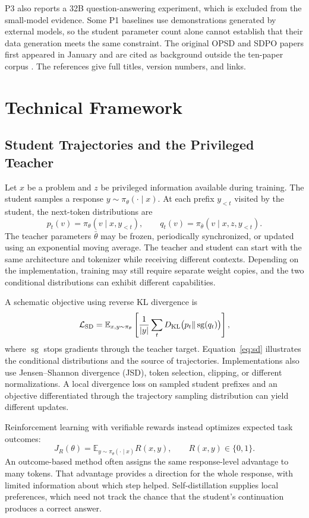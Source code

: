 \documentclass[11pt,a4paper]{article}
\begin{document}
P3 also reports a 32B question-answering experiment, which is excluded from the small-model evidence. Some P1 baselines use demonstrations generated by external models, so the student parameter count alone cannot establish that their data generation meets the same constraint. The original OPSD and SDPO papers first appeared in January and are cited as background outside the ten-paper corpus \cite{opsd,sdpo}. The references give full titles, version numbers, and links.

\section{Technical Framework}
\subsection{Student Trajectories and the Privileged Teacher}
Let \(x\) be a problem and \(z\) be privileged information available during training. The student samples a response \(y\sim\pi_\theta(\cdot\mid x)\). At each prefix \(y_{<t}\) visited by the student, the next-token distributions are
\begin{equation}
p_t(v)=\pi_\theta(v\mid x,y_{<t}),\qquad
q_t(v)=\pi_{\bar\theta}(v\mid x,z,y_{<t}).
\end{equation}
The teacher parameters \(\bar\theta\) may be frozen, periodically synchronized, or updated using an exponential moving average. The teacher and student can start with the same architecture and tokenizer while receiving different contexts. Depending on the implementation, training may still require separate weight copies, and the two conditional distributions can exhibit different capabilities.

A schematic objective using reverse KL divergence is
\begin{equation}
\mathcal L_{\rm SD}=\mathbb E_{x,y\sim\pi_\theta}
\left[\frac{1}{|y|}\sum_t
D_{\rm KL}\bigl(p_t\|\operatorname{sg}(q_t)\bigr)\right],
\label{eq:sd}
\end{equation}
where \(\operatorname{sg}\) stops gradients through the teacher target. Equation~\eqref{eq:sd} illustrates the conditional distributions and the source of trajectories. Implementations also use Jensen--Shannon divergence (JSD), token selection, clipping, or different normalizations. A local divergence loss on sampled student prefixes and an objective differentiated through the trajectory sampling distribution can yield different updates.

Reinforcement learning with verifiable rewards instead optimizes expected task outcomes:
\begin{equation}
J_R(\theta)=\mathbb E_{y\sim\pi_\theta(\cdot\mid x)}R(x,y),\qquad
R(x,y)\in\{0,1\}.
\end{equation}
An outcome-based method often assigns the same response-level advantage to many tokens. That advantage provides a direction for the whole response, with limited information about which step helped. Self-distillation supplies local preferences, which need not track the chance that the student's continuation produces a correct answer.
\end{document}
